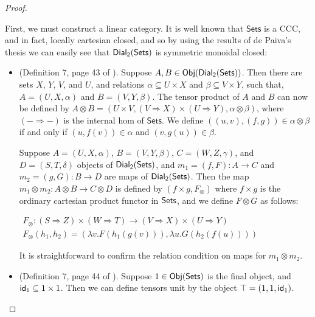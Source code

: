 \begin{proof}
\begin{report}
  First, we must construct a linear category. It is well known that
  $\mathsf{Sets}$ is a CCC, and in fact, locally cartesian closed, and
  so by using the results of de Paiva's thesis we can easily see that
  $\mathsf{Dial_2}(\mathsf{Sets})$ is symmetric monoidal closed:
  \begin{center}
    \begin{itemize}
    \item (Definition 7, page 43 of \cite{dePaiva:1988}). Suppose
      $A,B \in \mathsf{Obj}(\mathsf{Dial_2}(\mathsf{Sets}))$.  Then there are sets $X$, $Y$, $V$, and
      $U$, and relations $\alpha \subseteq U \times X$ and
      $\beta \subseteq V \times Y$, such that, $A = (U,X,\alpha)$ and
      $B = (V,Y,\beta)$.  The tensor product of $A$ and $B$ can now be
      defined by $A \otimes B = (U \times V, (V \Rightarrow X) \times
      (U \Rightarrow Y),\alpha \otimes \beta)$, where $(- \Rightarrow
      -)$ is the internal hom of $\mathsf{Sets}$.  We define
      $((u,v),(f,g)) \in \alpha \otimes \beta$ if and only if
      $(u,f(v)) \in \alpha$ and $(v,g(u)) \in \beta$.  

      Suppose $A = (U,X,\alpha)$, $B = (V,Y,\beta)$,
      $C = (W,Z,\gamma)$, and $D = (S,T,\delta)$ objects of $\mathsf{Dial_2}(\mathsf{Sets})$,
      and $m_1 = (f, F) : A \to C$ and $m_2 = (g,G) : B \to D$ are
      maps of $\mathsf{Dial_2}(\mathsf{Sets})$.  Then the map $m_1 \otimes m_2 : A \otimes B
      \to C \otimes D$ is defined by $(f \times g, F_\otimes)$ where
      $f \times g$ is the ordinary cartesian product functor in
      $\mathsf{Sets}$, and we define $F \otimes G$ as follows:
      \begin{center}
        \begin{math}
          \begin{array}{lll}
            F_\otimes : (S \Rightarrow Z) \times (W \Rightarrow T) \to (V \Rightarrow X) \times (U \Rightarrow Y)\\
            F_\otimes(h_1,h_2) = (\lambda v.F(h_1(g(v))),\lambda u.G(h_2(f(u))))
          \end{array}
        \end{math}
      \end{center}
      It is straightforward to confirm the relation condition on maps
      for $m_1 \otimes m_2$.

    \item (Definition 7, page 44 of \cite{dePaiva:1988}). Suppose
      $1 \in \mathsf{Obj}(\mathsf{Sets})$ is the final object, and
      $\mathsf{id}_1 \subseteq 1 \times 1$.  Then we can define tensors
      unit by the object $\top = (1,1,\mathsf{id}_1)$.


\end{itemize}
\end{center}
\end{report}
\end{proof}
